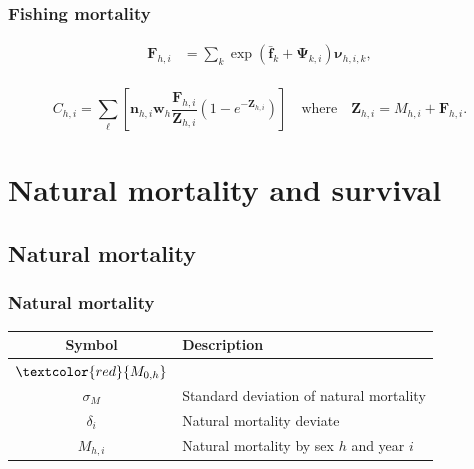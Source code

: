 \documentclass{beamer}
\begin{document}

\begin{frame}
\frametitle{Fishing mortality}
\begin{align*}
  \boldsymbol{F}_{h,i} &= \sum_k \exp \left( \bar{\boldsymbol{f}}_k +
    \boldsymbol\Psi_{k,i} \right) \boldsymbol\nu_{h,i,k},\\
\end{align*}

\begin{equation*}
  C_{h,i} = \sum_{\ell} \left[ \boldsymbol{n}_{h,i} \boldsymbol{w}_{h} \frac{\boldsymbol{F}_{h,i}}{\boldsymbol{Z}_{h,i}} 
    \left( 1 - e^{-\boldsymbol{Z}_{h,i}} \right) \right] \quad \text{where} \quad \boldsymbol{Z}_{h,i}
  = M_{h,i} + \boldsymbol{F}_{h,i}.
\end{equation*}

\end{frame}


\section{Natural mortality and survival}


\subsection{Natural mortality}
\begin{frame}
\frametitle{Natural mortality}
\begin{table}
  \centering
  \begin{tabular}{cl}
  \hline
  Symbol  & Description \\
  \hline
      $\textcolor{red}{M_{0,h}}$ &  \\
      $\sigma_M$ & Standard deviation of natural mortality \\
      $\delta_i$ & Natural mortality deviate \\
      $M_{h,i}$ & Natural mortality by sex $h$ and year $i$ \\
  \hline
  \end{tabular}
\end{table}
\end{frame}
\end{document}
